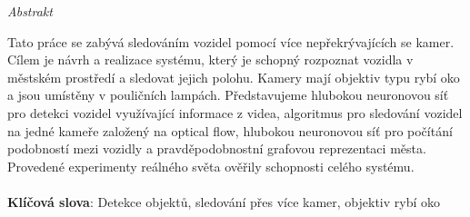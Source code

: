 \vfill
\begin{center}
{\it \large Abstrakt}
\vspace{0.2cm}

\begin{minipage}{0.8\textwidth}{
Tato práce se zabývá sledováním vozidel pomocí více nepřekrývajících se kamer. Cílem je návrh a realizace systému, který je schopný rozpoznat vozidla v městském prostředí a sledovat jejich polohu. Kamery mají objektiv typu rybí oko a jsou umístěny v pouličních lampách. Představujeme hlubokou neuronovou síť pro detekci vozidel využívající informace z videa, algoritmus pro sledování vozidel na jedné kameře založený na optical flow, hlubokou neuronovou síť pro počítání podobností mezi vozidly a pravděpodobnostní grafovou reprezentaci města. Provedené experimenty reálného světa ověřily schopnosti celého systému.
\\
\\
\textbf{Klíčová slova}: Detekce objektů, sledování přes více kamer, objektiv rybí oko
}
\end{minipage}
\end{center}
\vfill
\vspace{1cm}
\newpage{}